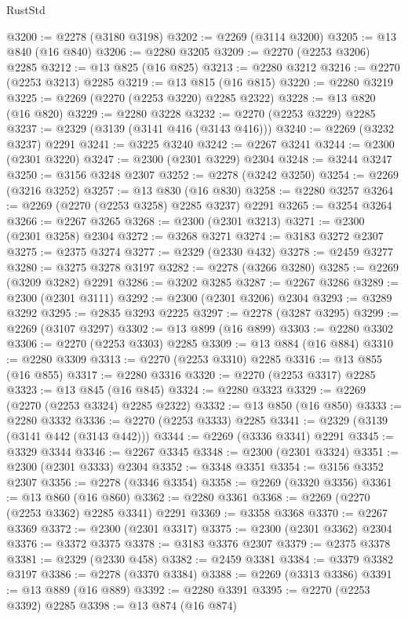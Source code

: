 \begin{lexlean}{RustStd}
\begin{coremodule}
@3200 := @2278 (@3180 @3198)
@3202 := @2269 (@3114 @3200)
@3205 := @13 @840 (@16 @840)
@3206 := @2280 @3205
@3209 := @2270 (@2253 @3206) @2285
@3212 := @13 @825 (@16 @825)
@3213 := @2280 @3212
@3216 := @2270 (@2253 @3213) @2285
@3219 := @13 @815 (@16 @815)
@3220 := @2280 @3219
@3225 := @2269 (@2270 (@2253 @3220) @2285 @2322)
@3228 := @13 @820 (@16 @820)
@3229 := @2280 @3228
@3232 := @2270 (@2253 @3229) @2285
@3237 := @2329 (@3139 (@3141 @416 (@3143 @416)))
@3240 := @2269 (@3232 @3237) @2291
@3241 := @3225 @3240
@3242 := @2267 @3241
@3244 := @2300 (@2301 @3220)
@3247 := @2300 (@2301 @3229) @2304
@3248 := @3244 @3247
@3250 := @3156 @3248 @2307
@3252 := @2278 (@3242 @3250)
@3254 := @2269 (@3216 @3252)
@3257 := @13 @830 (@16 @830)
@3258 := @2280 @3257
@3264 := @2269 (@2270 (@2253 @3258) @2285 @3237) @2291
@3265 := @3254 @3264
@3266 := @2267 @3265
@3268 := @2300 (@2301 @3213)
@3271 := @2300 (@2301 @3258) @2304
@3272 := @3268 @3271
@3274 := @3183 @3272 @2307
@3275 := @2375 @3274
@3277 := @2329 (@2330 @432)
@3278 := @2459 @3277
@3280 := @3275 @3278 @3197
@3282 := @2278 (@3266 @3280)
@3285 := @2269 (@3209 @3282) @2291
@3286 := @3202 @3285
@3287 := @2267 @3286
@3289 := @2300 (@2301 @3111)
@3292 := @2300 (@2301 @3206) @2304
@3293 := @3289 @3292
@3295 := @2835 @3293 @2225
@3297 := @2278 (@3287 @3295)
@3299 := @2269 (@3107 @3297)
@3302 := @13 @899 (@16 @899)
@3303 := @2280 @3302
@3306 := @2270 (@2253 @3303) @2285
@3309 := @13 @884 (@16 @884)
@3310 := @2280 @3309
@3313 := @2270 (@2253 @3310) @2285
@3316 := @13 @855 (@16 @855)
@3317 := @2280 @3316
@3320 := @2270 (@2253 @3317) @2285
@3323 := @13 @845 (@16 @845)
@3324 := @2280 @3323
@3329 := @2269 (@2270 (@2253 @3324) @2285 @2322)
@3332 := @13 @850 (@16 @850)
@3333 := @2280 @3332
@3336 := @2270 (@2253 @3333) @2285
@3341 := @2329 (@3139 (@3141 @442 (@3143 @442)))
@3344 := @2269 (@3336 @3341) @2291
@3345 := @3329 @3344
@3346 := @2267 @3345
@3348 := @2300 (@2301 @3324)
@3351 := @2300 (@2301 @3333) @2304
@3352 := @3348 @3351
@3354 := @3156 @3352 @2307
@3356 := @2278 (@3346 @3354)
@3358 := @2269 (@3320 @3356)
@3361 := @13 @860 (@16 @860)
@3362 := @2280 @3361
@3368 := @2269 (@2270 (@2253 @3362) @2285 @3341) @2291
@3369 := @3358 @3368
@3370 := @2267 @3369
@3372 := @2300 (@2301 @3317)
@3375 := @2300 (@2301 @3362) @2304
@3376 := @3372 @3375
@3378 := @3183 @3376 @2307
@3379 := @2375 @3378
@3381 := @2329 (@2330 @458)
@3382 := @2459 @3381
@3384 := @3379 @3382 @3197
@3386 := @2278 (@3370 @3384)
@3388 := @2269 (@3313 @3386)
@3391 := @13 @889 (@16 @889)
@3392 := @2280 @3391
@3395 := @2270 (@2253 @3392) @2285
@3398 := @13 @874 (@16 @874)

\end{coremodule}
\end{lexlean}
